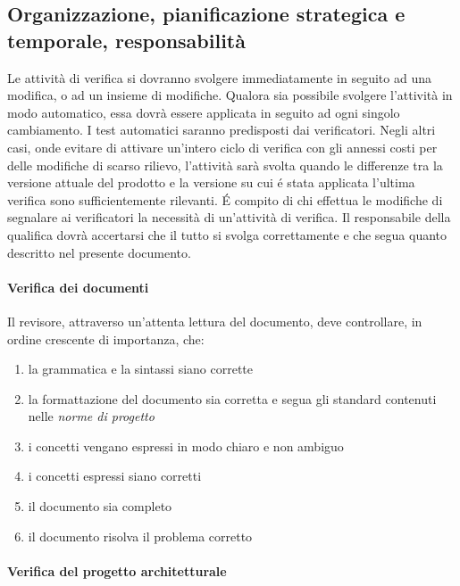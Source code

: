 \documentclass[a4paper]{article}
\begin{document}
\subsection{Organizzazione, pianificazione strategica e temporale, responsabilit\`a}
Le attivit\`a di verifica si dovranno svolgere immediatamente in seguito ad una modifica, o ad un insieme di modifiche. Qualora sia possibile svolgere l'attivit\`a in modo automatico, essa dovr\`a essere applicata in seguito ad ogni singolo cambiamento. I test automatici saranno predisposti dai verificatori. Negli altri casi, onde evitare di attivare un'intero ciclo di verifica con gli annessi costi per delle modifiche di scarso rilievo, l'attivit\`a sar\`a svolta quando le differenze tra la versione attuale del prodotto e la versione su cui \'e stata applicata l'ultima verifica sono sufficientemente rilevanti. \'E compito di chi effettua le modifiche di segnalare ai verificatori la necessit\`a di un'attivit\`a di verifica. Il responsabile della qualifica dovr\`a accertarsi che il tutto si svolga correttamente e che segua quanto descritto nel presente documento.
\paragraph{Verifica dei documenti} Il revisore, attraverso un'attenta lettura del documento, deve controllare, in ordine crescente di importanza, che:
\begin{enumerate}
\item la grammatica e la sintassi siano corrette
\item la formattazione del documento sia corretta e segua gli standard contenuti nelle \textit{norme di progetto}
\item i concetti vengano espressi in modo chiaro e non ambiguo
\item i concetti espressi siano corretti
\item il documento sia completo
\item il documento risolva il problema corretto
\end{enumerate}
\paragraph{Verifica del progetto architetturale}
\end{document}
